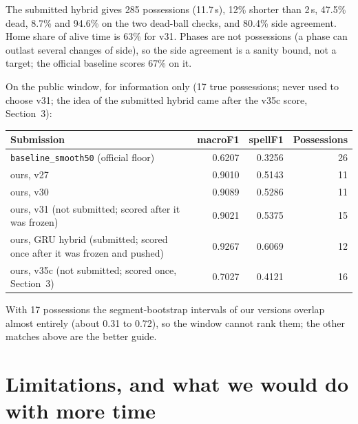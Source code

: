 \documentclass[11pt,a4paper]{article}
\newcommand{\code}[1]{\texttt{#1}}
\newcommand{\st}[1]{\textbf{#1}}
\begin{document}
The submitted hybrid gives 285 possessions (11.7\,s), 12\% shorter than 2\,s, 47.5\% dead, 8.7\% and
94.6\% on the two dead-ball checks, and 80.4\% side agreement. Home share of alive time is 63\% for v31. Phases are not possessions (a phase can outlast several changes of
side), so the side agreement is a sanity bound, not a target; the official baseline scores 67\% on it.

On the public window, for information only (17 true possessions; never used to choose v31; the idea of the submitted hybrid came after the v35c score,
Section~3):

\begin{center}\small
\begin{tabular}{@{}l r r r@{}}
\toprule
\st{Submission} & \st{macroF1} & \st{spellF1} & \st{Possessions} \\
\midrule
\code{baseline\_smooth50} (official floor) & 0.6207 & 0.3256 & 26 \\
ours, v27 & 0.9010 & 0.5143 & 11 \\
ours, v30 & 0.9089 & 0.5286 & 11 \\
ours, v31 (not submitted; scored after it was frozen) & 0.9021 & 0.5375 & 15 \\
ours, GRU hybrid (submitted; scored once after it was frozen and pushed) & 0.9267 & 0.6069 & 12 \\
ours, v35c (not submitted; scored once, Section~3) & 0.7027 & 0.4121 & 16 \\
\bottomrule
\end{tabular}
\end{center}

With 17 possessions the segment-bootstrap intervals of our versions overlap almost entirely (about
0.31 to 0.72), so the window cannot rank them; the other matches above are the better guide.

\section{Limitations, and what we would do with more time}
\end{document}
